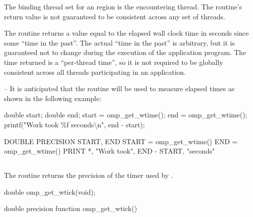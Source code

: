 \binding
The binding thread set for an  region is the encountering thread. The 
routine’s return value is not guaranteed to be consistent across any set of threads.

\effect
The  routine returns a value equal to the elapsed wall clock time in 
seconds since some ``time in the past''. The actual ``time in the past'' is arbitrary, but it is 
guaranteed not to change during the execution of the application program. The time 
returned is a ``per-thread time'', so it is not required to be globally consistent across all 
threads participating in an application.

\notestart
\noteheader – It is anticipated that the routine will be used to measure elapsed times as shown 
in the following example:

\ccppspecificstart
\begin{boxedcode}
double start;
double end;
start = omp\_get\_wtime();
end = omp\_get\_wtime();
printf("Work took \%f seconds{\textbackslash}n", end - start);
\end{boxedcode}
\ccppspecificend

\fortranspecificstart
\begin{boxedcode}
DOUBLE PRECISION START, END
START = omp\_get\_wtime()
END = omp\_get\_wtime()
PRINT *, "Work took", END - START, "seconds"
\end{boxedcode}
\fortranspecificend
\noteend










\pagebreak
\subsection{}
\label{subsec:omp_get_wtick}
\summary
The  routine returns the precision of the timer used by 
.

\format
\ccppspecificstart
\begin{boxedcode}
double omp\_get\_wtick(void);
\end{boxedcode}
\ccppspecificend

\fortranspecificstart
\begin{boxedcode}
double precision function omp\_get\_wtick()
\end{boxedcode}
\fortranspecificend


